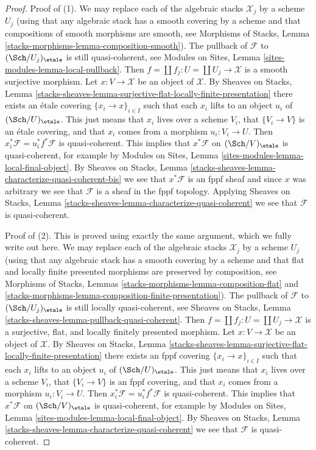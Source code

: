 \begin{proof}
Proof of (1). We may replace each of the algebraic stacks $\mathcal{X}_j$
by a scheme $U_j$ (using that any algebraic stack has a smooth covering by
a scheme and that compositions of smooth morphisms are smooth, see
Morphisms of Stacks, Lemma \ref{stacks-morphisms-lemma-composition-smooth}).
The pullback of $\mathcal{F}$ to $(\Sch/U_j)_\etale$ is still
quasi-coherent, see
Modules on Sites, Lemma \ref{sites-modules-lemma-local-pullback}.
Then $f = \coprod f_j : U = \coprod U_j \to \mathcal{X}$ is a smooth surjective
morphism. Let $x : V \to \mathcal{X}$ be an object of $\mathcal{X}$. By
Sheaves on Stacks, Lemma
\ref{stacks-sheaves-lemma-surjective-flat-locally-finite-presentation}
there exists an \'etale covering $\{x_i \to x\}_{i \in I}$
such that each $x_i$ lifts to an object $u_i$ of $(\Sch/U)_\etale$.
This just means that $x_i$ lives over a scheme $V_i$, that
$\{V_i \to V\}$ is an \'etale covering, and that $x_i$ comes from
a morphism $u_i : V_i \to U$. Then
$x_i^*\mathcal{F} = u_i^*f^*\mathcal{F}$ is quasi-coherent.
This implies that $x^*\mathcal{F}$ on $(\Sch/V)_\etale$
is quasi-coherent, for example by
Modules on Sites, Lemma \ref{sites-modules-lemma-local-final-object}.
By Sheaves on Stacks, Lemma
\ref{stacks-sheaves-lemma-characterize-quasi-coherent-bis}
we see that $x^*\mathcal{F}$ is an fppf sheaf and since $x$
was arbitrary we see that $\mathcal{F}$ is a sheaf in the
fppf topology. Applying Sheaves on Stacks, Lemma
\ref{stacks-sheaves-lemma-characterize-quasi-coherent}
we see that $\mathcal{F}$ is quasi-coherent.

\medskip\noindent
Proof of (2). This is proved using exactly the same argument, which we fully
write out here. We may replace each of the algebraic stacks $\mathcal{X}_j$
by a scheme $U_j$ (using that any algebraic stack has a smooth covering by
a scheme and that flat and locally finite presented morphisms are preserved
by composition, see Morphisms of Stacks, Lemmas
\ref{stacks-morphisms-lemma-composition-flat} and
\ref{stacks-morphisms-lemma-composition-finite-presentation}).
The pullback of $\mathcal{F}$ to $(\Sch/U_j)_\etale$ is still
locally quasi-coherent, see
Sheaves on Stacks, Lemma \ref{stacks-sheaves-lemma-pullback-quasi-coherent}.
Then $f = \coprod f_j : U = \coprod U_j \to \mathcal{X}$ is a surjective,
flat, and locally finitely presented morphism. Let
$x : V \to \mathcal{X}$ be an object of $\mathcal{X}$. By
Sheaves on Stacks, Lemma
\ref{stacks-sheaves-lemma-surjective-flat-locally-finite-presentation}
there exists an fppf covering $\{x_i \to x\}_{i \in I}$
such that each $x_i$ lifts to an object $u_i$ of $(\Sch/U)_\etale$.
This just means that $x_i$ lives over a scheme $V_i$, that
$\{V_i \to V\}$ is an fppf covering, and that $x_i$ comes from
a morphism $u_i : V_i \to U$. Then
$x_i^*\mathcal{F} = u_i^*f^*\mathcal{F}$ is quasi-coherent.
This implies that $x^*\mathcal{F}$ on $(\Sch/V)_\etale$
is quasi-coherent, for example by
Modules on Sites, Lemma \ref{sites-modules-lemma-local-final-object}.
By Sheaves on Stacks, Lemma
\ref{stacks-sheaves-lemma-characterize-quasi-coherent}
we see that $\mathcal{F}$ is quasi-coherent.
\end{proof}

